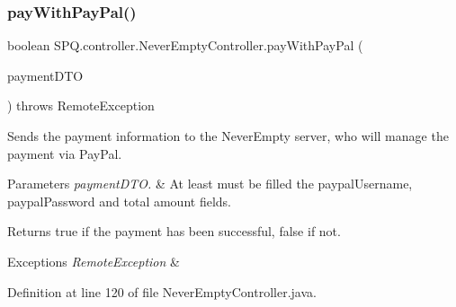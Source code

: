 \subsubsection{\texorpdfstring{pay\+With\+Pay\+Pal()}{payWithPayPal()}}
{\footnotesize\ttfamily boolean S\+P\+Q.\+controller.\+Never\+Empty\+Controller.\+pay\+With\+Pay\+Pal (\begin{DoxyParamCaption}\item[{\mbox{\hyperlink{class_s_p_q_1_1dto_1_1_payment_d_t_o}{Payment\+D\+TO}}}]{payment\+D\+TO }\end{DoxyParamCaption}) throws Remote\+Exception}

Sends the payment information to the Never\+Empty server, who will manage the payment via Pay\+Pal. 
\begin{DoxyParams}{Parameters}
{\em payment\+D\+T\+O.} & At least must be filled the paypal\+Username, paypal\+Password and total amount fields. \\
\hline
\end{DoxyParams}
\begin{DoxyReturn}{Returns}
true if the payment has been successful, false if not. 
\end{DoxyReturn}

\begin{DoxyExceptions}{Exceptions}
{\em Remote\+Exception} & \\
\hline
\end{DoxyExceptions}


Definition at line 120 of file Never\+Empty\+Controller.\+java.

